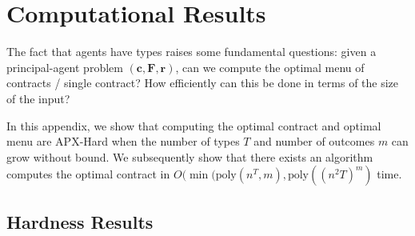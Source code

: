 \documentclass{article}
\newcommand{\poly}{\mathrm{poly}}
\newcommand{\costvector}{\bm{c}}
\newcommand{\ForecastTensor}{\bm{F}}
\newcommand{\rewardvector}{\bm{r}}
\newcommand{\PrincipalAgentProblem}{\left(\costvector, \ForecastTensor, \rewardvector\right)}
\newcommand{\ApxHard}{\textsc{APX}-Hard\xspace}
\begin{document}
\section{Computational Results}
\label{sec:computation}

The fact that agents have types raises some fundamental questions: given a principal-agent problem $\PrincipalAgentProblem$, can we compute the optimal menu of contracts / single contract? How efficiently can this be done in terms of the size of the input?

In this appendix, we show that computing the optimal contract and optimal menu are \ApxHard{} when the number of types $T$ and number of outcomes $m$ can grow without bound. We subsequently show that there exists an algorithm computes the optimal contract in $O(\min(\poly(n^T,m), \poly((n^2T)^m)$ time. 

\subsection{Hardness Results}


\apxhardness*
\end{document}

